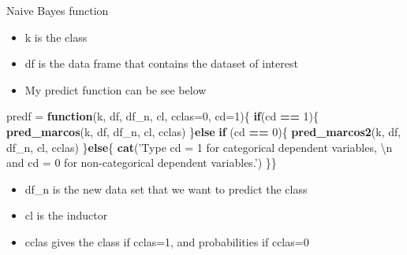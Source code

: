 \documentclass[
  10pt,
  ignorenonframetext,
]{beamer}
\newenvironment{Shaded}{\begin{snugshade}}{\end{snugshade}}
\newcommand{\CharTok}[1]{\textcolor[rgb]{0.31,0.60,0.02}{#1}}
\newcommand{\ControlFlowTok}[1]{\textcolor[rgb]{0.13,0.29,0.53}{\textbf{#1}}}
\newcommand{\DataTypeTok}[1]{\textcolor[rgb]{0.13,0.29,0.53}{#1}}
\newcommand{\DecValTok}[1]{\textcolor[rgb]{0.00,0.00,0.81}{#1}}
\newcommand{\KeywordTok}[1]{\textcolor[rgb]{0.13,0.29,0.53}{\textbf{#1}}}
\newcommand{\NormalTok}[1]{#1}
\newcommand{\OperatorTok}[1]{\textcolor[rgb]{0.81,0.36,0.00}{\textbf{#1}}}
\newcommand{\StringTok}[1]{\textcolor[rgb]{0.31,0.60,0.02}{#1}}
\providecommand{\tightlist}{%
  \setlength{\itemsep}{0pt}\setlength{\parskip}{0pt}}
\begin{document}
\begin{frame}[fragile]{Naive Bayes function}
\protect\hypertarget{naive-bayes-function-1}{}

\begin{itemize}
\tightlist
\item
  k is the class
\item
  df is the data frame that contains the dataset of interest
\item
  My predict function can be see below
\end{itemize}

\begin{Shaded}
\begin{Highlighting}[]
\NormalTok{predf =}\StringTok{ }\ControlFlowTok{function}\NormalTok{(k, df, df_n, cl, }\DataTypeTok{cclas=}\DecValTok{0}\NormalTok{, }\DataTypeTok{cd=}\DecValTok{1}\NormalTok{)\{}
  \ControlFlowTok{if}\NormalTok{(cd }\OperatorTok{==}\StringTok{ }\DecValTok{1}\NormalTok{)\{}
    \KeywordTok{pred_marcos}\NormalTok{(k, df, df_n, cl, cclas)}
\NormalTok{  \}}\ControlFlowTok{else} \ControlFlowTok{if}\NormalTok{ (cd }\OperatorTok{==}\StringTok{ }\DecValTok{0}\NormalTok{)\{}
    \KeywordTok{pred_marcos2}\NormalTok{(k, df, df_n, cl, cclas)}
\NormalTok{  \}}\ControlFlowTok{else}\NormalTok{\{}
    \KeywordTok{cat}\NormalTok{(}\StringTok{'Type cd = 1 for categorical dependent variables, }
\StringTok{    }\CharTok{\textbackslash{}n}\StringTok{ and cd = 0 for non-categorical dependent variables.'}\NormalTok{)}
\NormalTok{  \}\} }
\end{Highlighting}
\end{Shaded}

\begin{itemize}
\tightlist
\item
  df\_n is the new data set that we want to predict the class
\item
  cl is the inductor
\item
  cclas gives the class if cclas=1, and probabilities if cclas=0
\end{itemize}

\end{frame}
\end{document}
